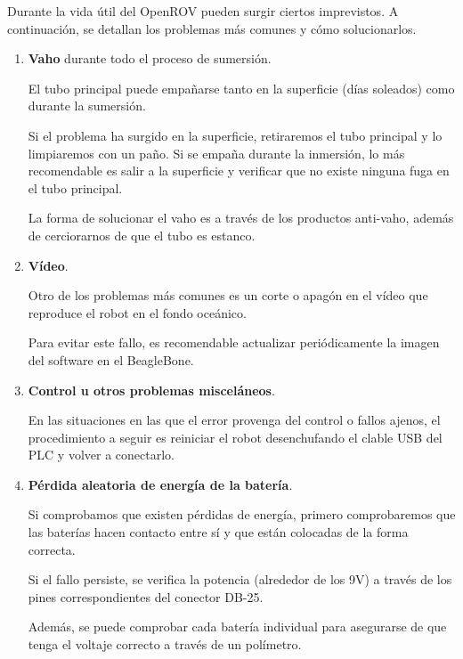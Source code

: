 Durante la vida útil del OpenROV pueden surgir ciertos imprevistos. A continuación, se detallan los problemas más comunes y cómo solucionarlos.
\begin{enumerate}
\item \textbf{Vaho} durante todo el proceso de sumersión.

El tubo principal puede empañarse tanto en la superficie (días soleados) como durante la sumersión.

Si el problema ha surgido en la superficie, retiraremos el tubo principal y lo limpiaremos con un paño. Si se empaña durante la inmersión, lo más recomendable es salir a la superficie y verificar que no existe ninguna fuga en el tubo principal.

La forma de solucionar el vaho es a través de los productos anti-vaho, además de cerciorarnos de que el tubo es estanco.

\item \textbf{Vídeo}.

Otro de los problemas más comunes es un corte o apagón en el vídeo que reproduce el robot en el fondo oceánico. 

Para evitar este fallo, es recomendable actualizar periódicamente la imagen del software en el BeagleBone.

\item \textbf{Control u otros problemas misceláneos}.

En las situaciones en las que el error provenga del control o fallos ajenos, el procedimiento a seguir es reiniciar el robot desenchufando el clable USB del PLC y volver a conectarlo.

\item \textbf{Pérdida aleatoria de energía de la batería}.

Si comprobamos que existen pérdidas de energía, primero comprobaremos que las baterías hacen contacto entre sí y que están colocadas de la forma correcta.

Si el fallo persiste, se verifica la potencia (alrededor de los 9V) a través de los pines correspondientes del conector DB-25.

Además, se puede comprobar cada batería individual para asegurarse de que tenga el voltaje correcto a través de un polímetro.


\end{enumerate}

